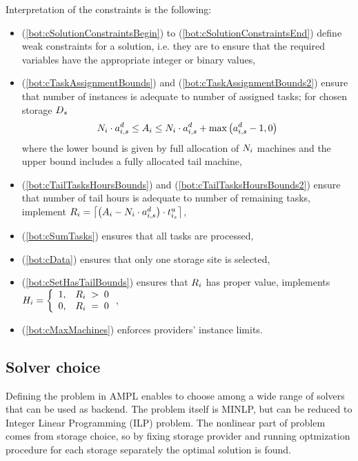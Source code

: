 {  Interpretation of the constraints is the following:
  \begin{itemize}
      \item(\ref{bot:cSolutionConstraintsBegin}) to
      (\ref{bot:cSolutionConstraintsEnd}) define weak constraints for a solution, i.e. they are to ensure that the required variables have the appropriate integer or binary values,
      \item(\ref{bot:cTaskAssignmentBounds}) and (\ref{bot:cTaskAssignmentBounds2}) ensure that number of instances is adequate to number of assigned tasks; for chosen storage $\DataAssignment_s$
      \begin{align*}
          \NumberInstances_i \cdot \tasksPerDeadline_{i,s} \leq \TaskAssignment_i \leq \NumberInstances_i \cdot \tasksPerDeadline_{i,s} + \max\left(\tasksPerDeadline_{i,s} - 1, 0\right)
      \end{align*} where the lower bound is given by full allocation of $\NumberInstances_i$ machines and the upper bound includes a fully allocated tail machine,
      \item(\ref{bot:cTailTasksHoursBounds}) and (\ref{bot:cTailTasksHoursBounds2})
      ensure that number of tail hours is adequate to number of remaining
      tasks, implement $\TailTaskHours_i = \ceil*{\left(\TaskAssignment_i - \NumberInstances_i \cdot \tasksPerDeadline_{i,s}\right) \cdot \unitTime_{i_s}}$,
      \item(\ref{bot:cSumTasks}) ensures that all tasks are processed,
      \item(\ref{bot:cData}) ensures that only one storage site is selected,
      \item(\ref{bot:cSetHasTailBounds}) ensures that $\TailTaskHours_i$ has proper value,
      implements $\HasTail_i = \left\{\begin{array}{cc} 1, & \TailTaskHours_i\; >\; 0 \\ 0, & \TailTaskHours_i\; =\; 0 \end{array}\right.$,
      \item(\ref{bot:cMaxMachines}) enforces providers' instance limits. 
  \end{itemize}

\subsection{Solver choice}

  Defining the problem in AMPL enables to choose among a wide range of solvers that can be used as backend. The problem itself is MINLP, but can be reduced to Integer Linear Programming (ILP) problem. The nonlinear part of problem comes from storage choice, so by fixing storage provider and running optmization procedure for each storage separately the optimal solution is found.

}
